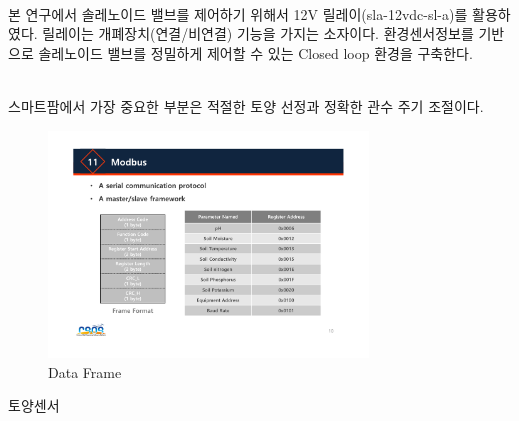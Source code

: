 \documentclass[11pt]{article}
\begin{document}
\indent \\본 연구에서 솔레노이드 밸브를 제어하기 위해서 12V 릴레이(sla-12vdc-sl-a)를 활용하였다. 릴레이는 개폐장치(연결/비연결) 기능을 가지는 소자이다. 환경센서정보를 기반으로 솔레노이드 밸브를 정밀하게 제어할 수 있는 Closed loop 환경을 구축한다. 

\indent \\스마트팜에서 가장 중요한 부분은 적절한 토양 선정과 정확한 관수 주기 조절이다. 


\begin{figure}[!htbp]
    \centering
       \includegraphics[width=8.5cm]{Figure/Frame_format.pdf}
       \hfil
    \caption{Data Frame}
    \label{Data_Frame}
\end{figure}

토양센서


\indent \\
\end{document}
